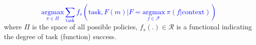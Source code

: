 \textcolor{blue}{
\begin{equation*}
        \underset{\pi \in \Pi}{\text{argmax}} \sum_{\text{task}} f_s \left(\text{task}, F(m) | F = \underset{f\in\mathcal{F} }{\text{argmax}} \ \pi(f|\text{context}) \right) 
\end{equation*}
}
\noindent where $\Pi$ is the space of all possible policies, $f_s(.) \in \mathcal{R}$ is a functional indicating the degree of task (function) success.


